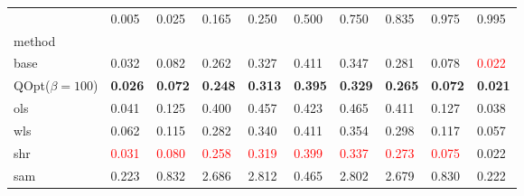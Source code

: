 \begin{tabular}{llllllllll}
\toprule
 & 0.005 & 0.025 & 0.165 & 0.250 & 0.500 & 0.750 & 0.835 & 0.975 & 0.995 \\
method &  &  &  &  &  &  &  &  &  \\
\midrule
base & 0.032 & 0.082 & 0.262 & 0.327 & 0.411 & 0.347 & 0.281 & 0.078 & \textcolor{red}{0.022} \\
\midrule
QOpt($\beta=100$) & \textbf{0.026} & \textbf{0.072} & \textbf{0.248} & \textbf{0.313} & \textbf{0.395} & \textbf{0.329} & \textbf{0.265} & \textbf{0.072} & \textbf{0.021} \\
ols & 0.041 & 0.125 & 0.400 & 0.457 & 0.423 & 0.465 & 0.411 & 0.127 & 0.038 \\
wls & 0.062 & 0.115 & 0.282 & 0.340 & 0.411 & 0.354 & 0.298 & 0.117 & 0.057 \\
shr & \textcolor{red}{0.031} & \textcolor{red}{0.080} & \textcolor{red}{0.258} & \textcolor{red}{0.319} & \textcolor{red}{0.399} & \textcolor{red}{0.337} & \textcolor{red}{0.273} & \textcolor{red}{0.075} & 0.022 \\
sam & 0.223 & 0.832 & 2.686 & 2.812 & 0.465 & 2.802 & 2.679 & 0.830 & 0.222 \\
\bottomrule
\end{tabular}